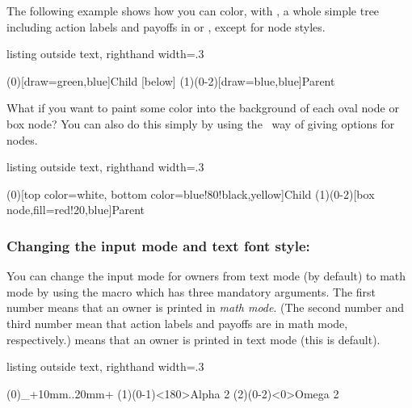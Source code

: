 The following example shows how you can color, with \cmd{\istrooto}, a whole simple tree including action labels and payoffs in  or , except for node styles.

\begin{tcblisting}{listing outside text, righthand width=.3\linewidth}
\begin{istgame}
(0)[draw=green,blue]{Child}
  [below]    \endist
\istrooto[-90,blue](1)(0-2)[draw=blue,blue]{Parent}
  \istb*  \istb  \endist
\end{istgame}
\end{tcblisting}

What if you want to paint some color into the background of each oval node or box node? You can also do this simply by using the \TikZ\ way of giving options for nodes.

\begin{tcblisting}{listing outside text, righthand width=.3\linewidth}
\begin{istgame}
\istrooto(0)[top color=white,
             bottom color=blue!80!black,yellow]{Child}
  \istb  \istb  \endist
\istrooto(1)(0-2)[box node,fill=red!20,blue]{Parent}
  \istb  \istb  \endist
\end{istgame}
\end{tcblisting}

\subsubsection{Changing the input mode and text font style: \protect\cmd{\setistmathTF(*)}}
\label{ssec:setistmathTF-owners}

You can change the input mode for owners from text mode (by default) to math mode by using the macro  which has three mandatory arguments.
The first number  means that an owner is printed in \emph{math mode}.
(The second number  and third number  mean that action labels and payoffs are in math mode, respectively.)
 means that an owner is printed in text mode (this is default).

\begin{tcblisting}{listing outside text, righthand width=.3\linewidth}
\begin{istgame}
\istroot(0){\Omega_{\alpha}}+10mm..20mm+
                               \istb \istb \endist
\istroot(1)(0-1)<180>{Alpha 2} \istb \istb \endist
{}   %
\istroot(2)(0-2)<0>{Omega 2}   \istb \istb \endist
\end{istgame}
\end{tcblisting}

